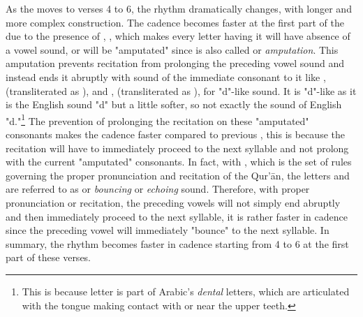 As the   moves to verses 4 to 6, the rhythm dramatically changes, with longer and more complex construction. The cadence becomes faster at the first part of the   due to the presence of  , , which makes every letter having it will have absence of a vowel sound, or will be "amputated" since   is also called   or \textit{amputation}. This amputation prevents recitation from prolonging the preceding vowel sound and instead ends it abruptly with sound of the immediate consonant to it like  ,  (transliterated as ), and  ,  (transliterated as ), for "d"-like sound. It is "d"-like as it is the English sound "d" but a little softer, so not exactly the sound of English "d."\footnote{This is because   letter is part of Arabic's \textit{dental} letters, which are articulated with the tongue making contact with or near the upper teeth.} The prevention of prolonging the recitation on these "amputated" consonants makes the cadence faster compared to previous  , this is because the recitation will have to immediately proceed to the next syllable and not prolong with the current "amputated" consonants. In fact, with  , which is the set of rules governing the proper pronunciation and recitation of the Qur'\=an, the letters    and    are referred to as   or \textit{bouncing} or \textit{echoing} sound. Therefore, with proper pronunciation or recitation, the preceding vowels will not simply end abruptly and then immediately proceed to the next syllable, it is rather faster in cadence since the preceding vowel will immediately "bounce" to the next syllable. In summary, the rhythm becomes faster in cadence starting from   4 to 6 at the first part of these verses. 

